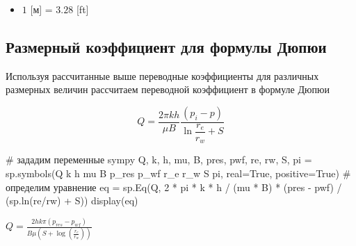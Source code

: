 \documentclass[
  russian,
  letterpaper,
  DIV=11,
  numbers=noendperiod,
  oneside]{scrartcl}
\newenvironment{Shaded}{\begin{snugshade}}{\end{snugshade}}
\newcommand{\CommentTok}[1]{\textcolor[rgb]{0.37,0.37,0.37}{#1}}
\newcommand{\DecValTok}[1]{\textcolor[rgb]{0.68,0.00,0.00}{#1}}
\newcommand{\NormalTok}[1]{\textcolor[rgb]{0.00,0.23,0.31}{#1}}
\newcommand{\OperatorTok}[1]{\textcolor[rgb]{0.37,0.37,0.37}{#1}}
\newcommand{\StringTok}[1]{\textcolor[rgb]{0.13,0.47,0.30}{#1}}
\newcommand{\VariableTok}[1]{\textcolor[rgb]{0.07,0.07,0.07}{#1}}
\providecommand{\tightlist}{%
  \setlength{\itemsep}{0pt}\setlength{\parskip}{0pt}}
\begin{document}
\begin{itemize}
\tightlist
\item
  \(1\) {[}м{]} = \(3.28\) {[}ft{]}
\end{itemize}

\subsection{Размерный коэффициент для формулы
Дюпюи}\label{ux440ux430ux437ux43cux435ux440ux43dux44bux439-ux43aux43eux44dux444ux444ux438ux446ux438ux435ux43dux442-ux434ux43bux44f-ux444ux43eux440ux43cux443ux43bux44b-ux434ux44eux43fux44eux438}

Используя рассчитанные выше переводные коэффициенты для различных
размерных величин рассчитаем переводной коэффициент в формуле Дюпюи

\[ 
Q = \frac{ 2 \pi kh}{ \mu B} \frac{  \left( p_i - p \right) } {\ln{\dfrac{r_e}{r_w}} +S } 
\]

\begin{Shaded}
\begin{Highlighting}[]
\CommentTok{\# зададим переменные sympy}
\NormalTok{Q, k, h, mu, B, pres, pwf, re, rw, S, pi }\OperatorTok{=}\NormalTok{ sp.symbols(}\StringTok{\textquotesingle{}Q k h mu B p\_res p\_wf r\_e r\_w S pi\textquotesingle{}}\NormalTok{, }
\NormalTok{                                                       real}\OperatorTok{=}\VariableTok{True}\NormalTok{, }
\NormalTok{                                                       positive}\OperatorTok{=}\VariableTok{True}\NormalTok{)}
\CommentTok{\# определим уравнение}
\NormalTok{eq }\OperatorTok{=}\NormalTok{ sp.Eq(Q, }\DecValTok{2} \OperatorTok{*}\NormalTok{ pi }\OperatorTok{*}\NormalTok{ k }\OperatorTok{*}\NormalTok{ h }\OperatorTok{/}\NormalTok{ (mu }\OperatorTok{*}\NormalTok{ B) }\OperatorTok{*}\NormalTok{ (pres }\OperatorTok{{-}}\NormalTok{ pwf) }\OperatorTok{/}\NormalTok{ (sp.ln(re}\OperatorTok{/}\NormalTok{rw) }\OperatorTok{+}\NormalTok{ S))}
\NormalTok{display(eq)}
\end{Highlighting}
\end{Shaded}

$\displaystyle Q = \frac{2 h k \pi \left(p_{res} - p_{wf}\right)}{B \mu \left(S + \log{\left(\frac{r_{e}}{r_{w}} \right)}\right)}$
\end{document}
